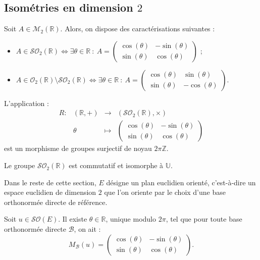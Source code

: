 \documentclass[french]{article}
\newcommand{\Z}{\mathbb{Z}}
\newcommand{\R}{\mathbb{R}}
\newcommand{\U}{\mathbb{U}}
\theoremstyle{plain}
\theoremstyle{definition}
\theoremstyle{remark}
\begin{document}
\subsection{Isométries en dimension $2$}

\begin{prop}
	Soit $A\in\mathcal{M}_2(\R)$. Alors, on dispose des caractérisations suivantes :
	\begin{itemize}
		\item $A\in\mathcal{SO}_2(\R)\iff \exists\theta\in\R\ : \ A=\displaystyle\begin{pmatrix}
			\cos(\theta)&-\sin(\theta)\\
			\sin(\theta)&\cos(\theta)
		\end{pmatrix}$ ;
		\item $A\in\mathcal{O}_2(\R)\setminus\mathcal{SO}_2(\R)\iff \exists\theta\in\R\ : \ A=\displaystyle\begin{pmatrix}
			\cos(\theta)&\sin(\theta)\\
			\sin(\theta)&-\cos(\theta)
		\end{pmatrix}$.
	\end{itemize}
\end{prop}

\begin{prop}
	L'application : $$\begin{array}{lrcl}
		R:&(\R,+)&\longrightarrow&(\mathcal{SO}_2(\R),\times)\\
		&\theta&\longmapsto&\displaystyle\begin{pmatrix}
			\cos(\theta)&-\sin(\theta)\\
			\sin(\theta)&\cos(\theta)
		\end{pmatrix} 
	\end{array}$$ est un morphisme de groupes surjectif de noyau $2\pi\Z$.
\end{prop}

\begin{cor}
	Le groupe $\mathcal{SO}_2(\R)$ est commutatif et isomorphe à $\U$.
\end{cor}

Dans le reste de cette section, $E$ désigne un plan euclidien orienté, c'est-à-dire un espace euclidien de dimension $2$ que l'on oriente par le choix d'une base orthonormée directe de référence.

\begin{prop}
	Soit $u\in\mathcal{SO}(E)$. Il existe $\theta\in\R$, unique modulo $2\pi$, tel que pour toute base orthonormée directe $\mathcal{B}$, on ait : $$M_\mathcal{B}(u)=\begin{pmatrix}
		\cos(\theta)&-\sin(\theta)\\
		\sin(\theta)&\cos(\theta)
	\end{pmatrix}.$$
\end{prop}
\end{document}
